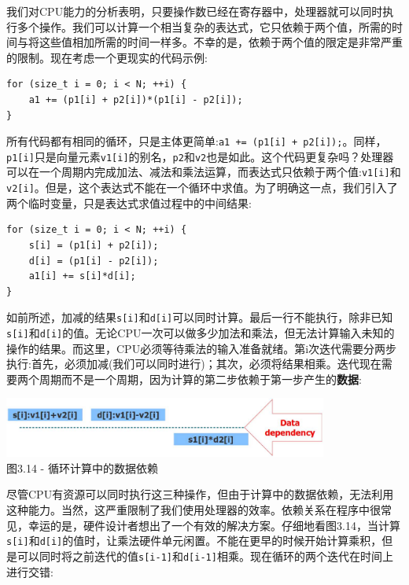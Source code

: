 我们对CPU能力的分析表明，只要操作数已经在寄存器中，处理器就可以同时执行多个操作。我们可以计算一个相当复杂的表达式，它只依赖于两个值，所需的时间与将这些值相加所需的时间一样多。不幸的是，依赖于两个值的限定是非常严重的限制。现在考虑一个更现实的代码示例:

\begin{lstlisting}[style=styleCXX]
for (size_t i = 0; i < N; ++i) {
	a1 += (p1[i] + p2[i])*(p1[i] - p2[i]);
}
\end{lstlisting}

所有代码都有相同的循环，只是主体更简单:\texttt{a1 += (p1[i] + p2[i]);}。同样，\texttt{p1[i]}只是向量元素\texttt{v1[i]}的别名，\texttt{p2}和\texttt{v2}也是如此。这个代码更复杂吗？处理器可以在一个周期内完成加法、减法和乘法运算，而表达式只依赖于两个值:\texttt{v1[i]}和\texttt{v2[i]}。但是，这个表达式不能在一个循环中求值。为了明确这一点，我们引入了两个临时变量，只是表达式求值过程中的中间结果:

\begin{lstlisting}[style=styleCXX]
for (size_t i = 0; i < N; ++i) {
	s[i] = (p1[i] + p2[i]);
	d[i] = (p1[i] - p2[i]);
	a1[i] += s[i]*d[i];
}
\end{lstlisting}

如前所述，加减的结果\texttt{s[i]}和\texttt{d[i]}可以同时计算。最后一行不能执行，除非已知\texttt{s[i]}和\texttt{d[i]}的值。无论CPU一次可以做多少加法和乘法，但无法计算输入未知的操作的结果。而这里，CPU必须等待乘法的输入准备就绪。第i次迭代需要分两步执行:首先，必须加减(我们可以同时进行)；其次，必须将结果相乘。迭代现在需要两个周期而不是一个周期，因为计算的第二步依赖于第一步产生的\textbf{数据}:

\begin{center}
\includegraphics[width=0.8\textwidth]{content/1/chapter3/images/14.jpg}\\
图3.14 - 循环计算中的数据依赖
\end{center}

尽管CPU有资源可以同时执行这三种操作，但由于计算中的数据依赖，无法利用这种能力。当然，这严重限制了我们使用处理器的效率。依赖关系在程序中很常见，幸运的是，硬件设计者想出了一个有效的解决方案。仔细地看图3.14，当计算\texttt{s[i]}和\texttt{d[i]}的值时，让乘法硬件单元闲置。不能在更早的时候开始计算乘积，但是可以同时将之前迭代的值\texttt{s[i-1]}和\texttt{d[i-1]}相乘。现在循环的两个迭代在时间上进行交错:

